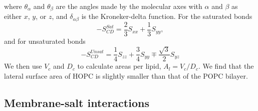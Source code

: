 \documentclass[12pt,openany,final]{book}
\begin{document}
where $\theta_\alpha$ and $\theta_\beta$ are the angles made 
by the molecular axes with $\alpha$ and $\beta$ as either $x$, $y$, or $z$, and $\delta_{\alpha\beta}$ is 
the Kroneker-delta function. For the saturated bonds~\cite{egberts:1988}
\begin{equation}
\label{eq:chainorderparam}
-S^{Sat}_{CD}=\frac{2}{3}S_{xx}+\frac{1}{3}S_{yy},
\end{equation}
and for unsaturated bonds~\cite{douliez:1995}
\begin{equation}
-S^{Unsat}_{CD}=\frac{1}{4}S_{zz}+\frac{3}{4}S_{yy}\mp \frac{\sqrt{3}}{2}S_{yz}
\label{eq:chainordunsat}
\end{equation}
We then use $V_c$ and $D_c$ to calculate areas per lipid, $A_l = V_c / D_c$. We find that the 
lateral surface area of HOPC is slightly smaller than that of the POPC bilayer.

\subsection{Membrane-salt interactions}
\end{document}
